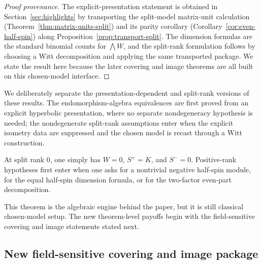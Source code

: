 \documentclass{birkjour}
\theoremstyle{plain}
\theoremstyle{definition}
\theoremstyle{remark}
\begin{document}
\begin{proof}[Proof provenance]
The explicit-presentation statement is obtained in
Section~\ref{sec:highlights} by transporting the split-model matrix-unit
calculation (Theorem~\ref{thm:matrix-units-split}) and its parity corollary
(Corollary~\ref{cor:even-half-spin}) along
Proposition~\ref{prop:transport-split}. The dimension formulas are the standard
binomial counts for $\bigwedge W$, and the split-rank formulation follows by
choosing a Witt decomposition and applying the same transported package. We
state the result here because the later covering and image theorems are all
built on this chosen-model interface.
\end{proof}

We deliberately separate the presentation-dependent and split-rank
versions of these results. The endomorphism-algebra equivalences are
first proved from an explicit hyperbolic presentation, where no separate
nondegeneracy hypothesis is needed; the nondegenerate split-rank assumptions
enter when the explicit isometry data are suppressed and the chosen model is
recast through a Witt construction.

At split rank $0$, one simply has $W=0$, $S^+=K$, and $S^-=0$. Positive-rank
hypotheses first enter when one asks for a nontrivial negative half-spin module,
for the equal half-spin dimension formula, or for the two-factor even-part
decomposition.

This theorem is the algebraic engine behind the paper, but it is still
classical chosen-model setup. The new theorem-level payoffs begin with the
field-sensitive covering and image statements stated next.

\subsection*{New field-sensitive covering and image package}
\end{document}

